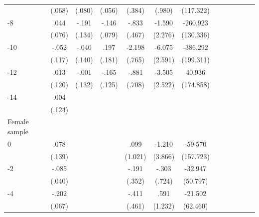 \begin{table}[!ht]
\begin{adjustbox}{max width=\linewidth}
\begin{threeparttable}
{\begin{tabular}{l*{6}{S
S}}
                &   (.068)         &   (.080)         &   (.056)         &   (.384)         &   (.980)         &(117.322)         \\
-8             &     .044         &    -.191         &    -.146\sym{*}  &    -.833\sym{*}  &   -1.590         & -260.923\sym{**} \\
                &   (.076)         &   (.134)         &   (.079)         &   (.467)         &  (2.276)         &(130.336)         \\
-10            &    -.052         &    -.040         &     .197         &   -2.198\sym{***}&   -6.075\sym{**} & -386.292\sym{*}  \\
                &   (.117)         &   (.140)         &   (.181)         &   (.765)         &  (2.591)         &(199.311)         \\
-12           &     .013         &    -.001         &    -.165         &    -.881         &   -3.505         &   40.936         \\
                &   (.120)         &   (.132)         &   (.125)         &   (.708)         &  (2.522)         &(174.858)         \\
-14           &     .004         &                  &                  &                  &                  &                  \\
                &   (.124)         &                  &                  &                  &                  &                  \\
\midrule
Female sample &&&&&&\\
0               &     .078         &         &         &     .099         &   -1.210         &  -59.570         \\
                &   (.139)         &         &         &  (1.021)         &  (3.866)         &(157.723)         \\
-2             &    -.085\sym{**} &         &         &    -.191         &    -.303         &  -32.947         \\
                &   (.040)         &         &         &   (.352)         &   (.724)         & (50.797)         \\
-4             &    -.202\sym{***}&         &         &    -.411         &     .591         &  -21.502         \\
                &   (.067)         &         &         &   (.461)         &  (1.232)         & (62.460)         \\

\end{tabular}}
\end{threeparttable}
\end{adjustbox}
\end{table}

